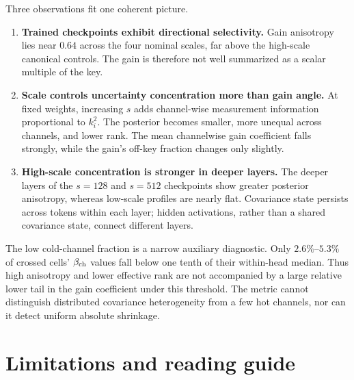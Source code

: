\documentclass[11pt]{article}
\begin{document}
Three observations fit one coherent picture.
\begin{enumerate}
  \item \textbf{Trained checkpoints exhibit directional selectivity.}  Gain anisotropy lies
  near $0.64$ across the four nominal scales, far above the high-scale canonical controls.
  The gain is therefore not well summarized as a scalar multiple of the key.
  \item \textbf{Scale controls uncertainty concentration more than gain angle.}  At fixed
  weights, increasing $s$ adds channel-wise measurement information proportional to $k_i^2$.
  The posterior becomes smaller, more unequal across channels, and lower rank.  The mean
  channelwise gain coefficient falls strongly, while the gain's off-key fraction changes only
  slightly.
  \item \textbf{High-scale concentration is stronger in deeper layers.}  The deeper layers
  of the $s=128$ and $s=512$ checkpoints show greater posterior anisotropy, whereas low-scale
  profiles are nearly flat.  Covariance state persists across tokens within each layer;
  hidden activations, rather than a shared covariance state, connect different layers.
\end{enumerate}

The low cold-channel fraction is a narrow auxiliary diagnostic.  Only $2.6\%$--$5.3\%$ of
crossed cells' $\beta_{\rm ch}$ values fall below one tenth of their within-head median.
Thus high anisotropy and lower effective rank are not accompanied by a large relative lower
tail in the gain coefficient under this threshold.  The metric cannot distinguish distributed
covariance heterogeneity from a few hot channels, nor can it detect uniform absolute shrinkage.

\section{Limitations and reading guide}
\end{document}
